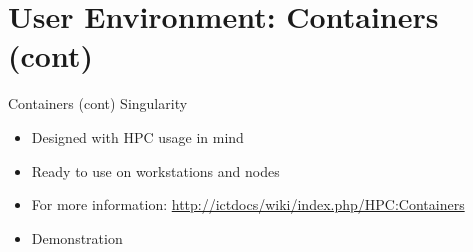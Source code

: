 {
\section{User Environment: Containers (cont)}
%
\begin{frame}{Containers (cont)}
\text Singularity
\begin{itemize}
\item Designed with HPC usage in mind
\item Ready to use on workstations and nodes
\item For more information: \href{http://ictdocs/wiki/index.php/HPC:Containers}{http://ictdocs/wiki/index.php/HPC:Containers}
\item{{\color{red}Demonstration}}
\end{itemize}
\end{frame}
}